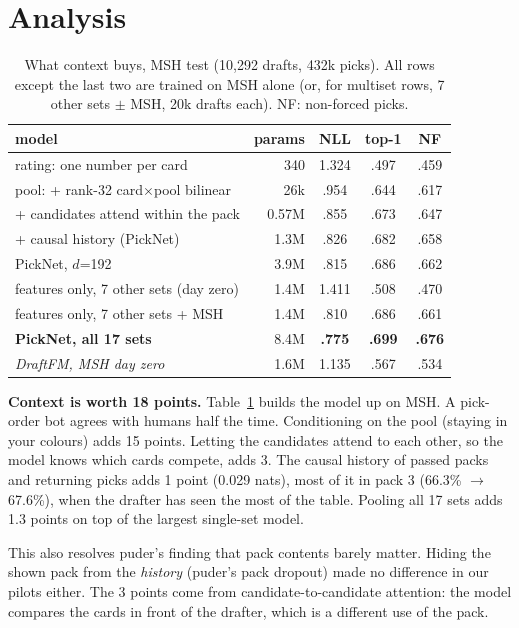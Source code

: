 \documentclass[10pt,letterpaper]{article}
\begin{document}
\section{Analysis}\label{sec:analysis}

\begin{table}[t]
\centering\small
\caption{What context buys, MSH test (10,292 drafts, 432k picks). All rows except the last two are trained
on MSH alone (or, for multiset rows, 7 other sets $\pm$ MSH, 20k drafts each). NF: non-forced picks.}
\label{tab:ablate}
\setlength{\tabcolsep}{3.2pt}
\begin{tabular}{lrccc}
\toprule
model & params & NLL & top-1 & NF \\
\midrule
rating: one number per card & 340 & 1.324 & .497 & .459 \\
pool: + rank-32 card$\times$pool bilinear & 26k & .954 & .644 & .617 \\
+ candidates attend within the pack & 0.57M & .855 & .673 & .647 \\
+ causal history (PickNet) & 1.3M & .826 & .682 & .658 \\
PickNet, $d$=192 & 3.9M & .815 & .686 & .662 \\
\midrule
features only, 7 other sets (day zero) & 1.4M & 1.411 & .508 & .470 \\
features only, 7 other sets + MSH & 1.4M & .810 & .686 & .661 \\
\midrule
\textbf{PickNet, all 17 sets} & 8.4M & \textbf{.775} & \textbf{.699} & \textbf{.676} \\
\textit{DraftFM, MSH day zero~\cite{draftfm}} & 1.6M & 1.135 & .567 & .534 \\
\bottomrule
\end{tabular}
\end{table}

\textbf{Context is worth 18 points.} Table~\ref{tab:ablate} builds the model up on MSH. A pick-order
bot agrees with humans half the time. Conditioning on the pool (staying in your colours) adds 15 points.
Letting the candidates attend to each other, so the model knows which cards compete, adds 3. The causal history
of passed packs and returning picks adds 1 point (0.029 nats), most of it in pack 3 (66.3\% $\to$ 67.6\%), when
the drafter has seen the most of the table. Pooling all 17 sets adds 1.3 points on top of the largest
single-set model.

This also resolves puder's finding that pack contents barely matter. Hiding the shown pack from the
\emph{history} (puder's pack dropout) made no difference in our pilots either. The 3 points come from
candidate-to-candidate attention: the model compares the cards in front of the drafter, which is a
different use of the pack.
\end{document}
